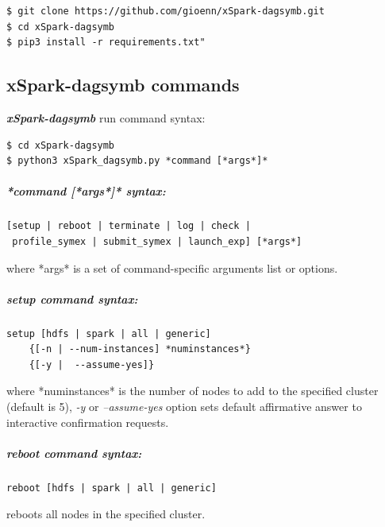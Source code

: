\begin{verbatim}
$ git clone https://github.com/gioenn/xSpark-dagsymb.git
$ cd xSpark-dagsymb
$ pip3 install -r requirements.txt"
\end{verbatim}

\hypertarget{xspark-dagsymb-commands}{%
\subsection{xSpark-dagsymb commands}\label{xspark-dagsymb-commands}}

\textbf{\textit{xSpark-dagsymb}} run command syntax:

\begin{verbatim}
$ cd xSpark-dagsymb
$ python3 xSpark_dagsymb.py *command [*args*]*
\end{verbatim}

\hypertarget{command-args-syntax}{%
\subparagraph{*command {[}*args*{]}*
	syntax:}\label{command-args-syntax}}

\begin{verbatim}
[setup | reboot | terminate | log | check | 
 profile_symex | submit_symex | launch_exp] [*args*]
\end{verbatim}

where *args* is a set of command-specific arguments list or options.

\hypertarget{setup-command-syntax}{%
\subparagraph{\texorpdfstring{\emph{setup} command
		syntax:}{setup command syntax:}}\label{setup-command-syntax}}

\begin{verbatim}
setup [hdfs | spark | all | generic] 
    {[-n | --num-instances] *numinstances*} 
    {[-y |  --assume-yes]}
\end{verbatim}

where *numinstances* is the number of nodes to add to the specified
cluster (default is 5), \emph{-y} or \emph{--assume-yes} option sets
default affirmative answer to interactive confirmation requests.

\hypertarget{reboot-command-syntax}{%
\subparagraph{\texorpdfstring{\emph{reboot} command
		syntax:}{reboot command syntax:}}\label{reboot-command-syntax}}

\begin{verbatim}
reboot [hdfs | spark | all | generic]
\end{verbatim}

reboots all nodes in the specified cluster.

